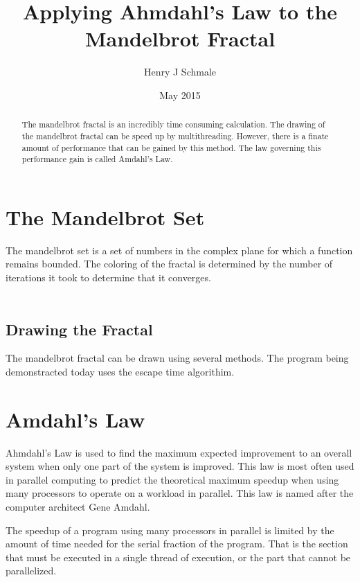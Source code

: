 \documentclass[10pt,oneside,letter]{article}
\begin{document}
\title{Applying Ahmdahl's Law to the Mandelbrot Fractal}
\author{Henry J Schmale}
\date{May 2015}
\maketitle

\begin{abstract}
The mandelbrot fractal is an incredibly time consuming calculation.
The drawing of the mandelbrot fractal can be speed up by multithreading.
However, there is a finate amount of performance that can be gained by
this method. The law governing this performance gain is called Amdahl's
Law.
\end{abstract}

\section{The Mandelbrot Set}
The mandelbrot set is a set of numbers in the complex plane for which
a function remains bounded. The coloring of the fractal is determined
by the number of iterations it took to determine that it converges.

\begin{equation}\label{eq:mandeldef}
    \begin{align}
    
    \end{align}
\end{equation}

\subsection{Drawing the Fractal}
The mandelbrot fractal can be drawn using several methods. The
program being demonstracted today uses the escape time algorithim.

\section{Amdahl's Law}
Ahmdahl's Law is used to find the maximum expected improvement to an overall
system when only one part of the system is improved. This law is most often
used in parallel computing to predict the theoretical maximum speedup when
using many processors to operate on a workload in parallel. This law is named
after the computer architect Gene Amdahl.

The speedup of a program using many processors in parallel is limited by the
amount of time needed for the serial fraction of the program. That is the
section that must be executed in a single thread of execution, or the part
that cannot be parallelized.
\end{document}
